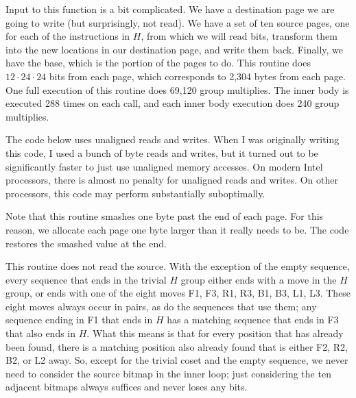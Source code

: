 Input to this function is a bit complicated.  We have a destination
page we are going to write (but surprisingly, not read).  We have
a set of ten source pages, one for each of the instructions in $H$,
from which we will read bits, transform them into the new locations
in our destination page, and write them back.  Finally, we have
the base, which is the portion of the pages to do.  This routine
does $12\cdot 24\cdot 24$ bits from each page, which corresponds to
2,304 bytes from each page.  One full execution of this routine
does 69,120 group multiplies.  The inner body is executed 288 times
on each call, and each inner body execution does 240 group
multiplies.

The code below uses unaligned reads and writes.  When I was
originally writing this code, I used a bunch of byte reads and
writes, but it turned out to be significantly faster to just
use unaligned memory accesses.  On modern Intel processors,
there is almost no penalty for unaligned reads and writes.  On
other processors, this code may perform substantially
suboptimally.

Note that this routine smashes one byte past the end of each page.
For this reason, we allocate each page one byte larger than it
really needs to be.  The code restores the smashed value at the
end.

This routine does not read the source.  With the exception of the
empty sequence, every sequence that ends in the trivial $H$ group
either ends with a move in the $H$ group, or ends with one of the
eight moves F1, F3, R1, R3, B1, B3, L1, L3.  These eight moves always
occur in pairs, as do the sequences that use them; any sequence ending
in F1 that ends in $H$ has a matching sequence that ends in F3 that
also ends in $H$.  What this means is that for every position that has
already been found, there is a matching position also already found
that is either F2, R2, B2, or L2 away.  So, except for the trivial
coset and the empty sequence, we never need to consider the source
bitmap in the inner loop; just considering the ten adjacent bitmaps
always suffices and never loses any bits.

